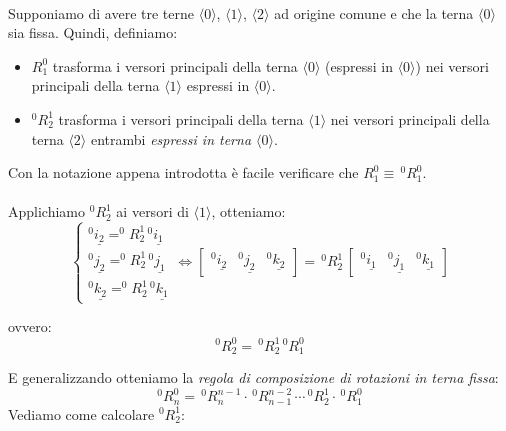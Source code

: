 \paragraph{}
Supponiamo di avere tre terne $\langle0\rangle$, $\langle1\rangle$, $\langle2\rangle$ ad origine comune e che la terna $\langle 0 \rangle$ sia fissa. Quindi, definiamo:
\begin{itemize}
	\item $R_1^0$ trasforma i versori principali della terna $\langle 0 \rangle$ (espressi in $\langle 0 \rangle$) nei versori principali della terna $\langle 1 \rangle$ espressi in $\langle 0 \rangle$.
	\item $^0R_2^1$ trasforma i versori principali della terna $\langle 1 \rangle$ nei versori principali della terna $\langle 2 \rangle$ entrambi \emph{espressi in terna $\langle 0 \rangle$}.
\end{itemize}

Con la notazione appena introdotta è facile verificare che $R_1^0 \equiv \,^0R_1^0$.
\paragraph{}
Applichiamo $^0R_2^1$ ai versori di $\langle1\rangle$, otteniamo:
\begin{equation*}
	\begin{cases}
		^0\underline{i_2} = ^0R_2^1 \, ^0\underline{i_1} \\
		^0\underline{j_2} = ^0R_2^1 \, ^0\underline{j_1} \\
		^0\underline{k_2} = ^0R_2^1 \, ^0\underline{k_1}
	\end{cases}
	\Leftrightarrow
	\begin{bmatrix}
		^0\underline{i_2} & ^0\underline{j_2} & ^0\underline{k_2}
	\end{bmatrix}
	= \,^0R_2^1 \,
	\begin{bmatrix}
		^0\underline{i_1} & ^0\underline{j_1} & ^0\underline{k_1}
	\end{bmatrix}
\end{equation*}  

ovvero:
\begin{equation*}
	^0R_2^0 = \,^0R_2^1 \, ^0R_1^0
\end{equation*}

E generalizzando otteniamo la \emph{regola di composizione di rotazioni in terna fissa}:
\begin{equation}
	^0R_n^0 = \,^0R_n^{n-1} \cdot \,^0R_{n-1}^{n-2} \,  \cdots \, ^0R_{2}^{1} \cdot \,^0R_{1}^{0}
\end{equation}
Vediamo come calcolare $^0R_2^1$:

